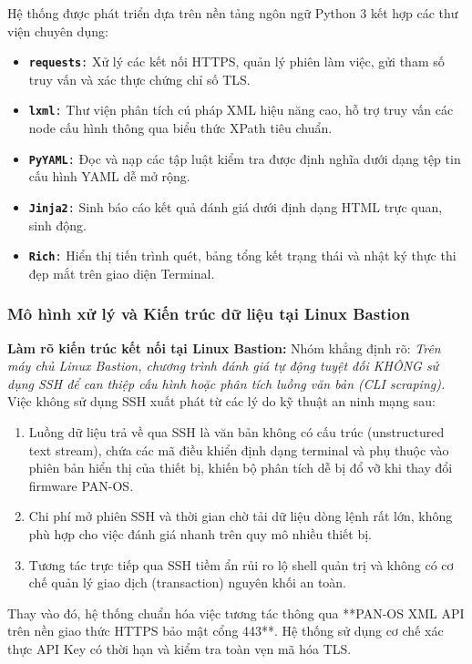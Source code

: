 \documentclass[12pt,a4paper]{article}
\begin{document}
Hệ thống được phát triển dựa trên nền tảng ngôn ngữ Python 3 kết hợp các thư viện chuyên dụng:
\begin{itemize}
    \item \texttt{\textbf{requests}:} Xử lý các kết nối HTTPS, quản lý phiên làm việc, gửi tham số truy vấn và xác thực chứng chỉ số TLS.
    \item \texttt{\textbf{lxml}:} Thư viện phân tích cú pháp XML hiệu năng cao, hỗ trợ truy vấn các node cấu hình thông qua biểu thức XPath tiêu chuẩn.
    \item \texttt{\textbf{PyYAML}:} Đọc và nạp các tập luật kiểm tra được định nghĩa dưới dạng tệp tin cấu hình YAML dễ mở rộng.
    \item \texttt{\textbf{Jinja2}:} Sinh báo cáo kết quả đánh giá dưới định dạng HTML trực quan, sinh động.
    \item \texttt{\textbf{Rich}:} Hiển thị tiến trình quét, bảng tổng kết trạng thái và nhật ký thực thi đẹp mắt trên giao diện Terminal.
\end{itemize}

\subsubsection{Mô hình xử lý và Kiến trúc dữ liệu tại Linux Bastion}
\noindent\textbf{Làm rõ kiến trúc kết nối tại Linux Bastion:}
Nhóm khẳng định rõ: \emph{Trên máy chủ Linux Bastion, chương trình đánh giá tự động tuyệt đối KHÔNG sử dụng SSH để can thiệp cấu hình hoặc phân tích luồng văn bản (CLI scraping).} Việc không sử dụng SSH xuất phát từ các lý do kỹ thuật an ninh mạng sau:
\begin{enumerate}
    \item Luồng dữ liệu trả về qua SSH là văn bản không có cấu trúc (unstructured text stream), chứa các mã điều khiển định dạng terminal và phụ thuộc vào phiên bản hiển thị của thiết bị, khiến bộ phân tích dễ bị đổ vỡ khi thay đổi firmware PAN-OS.
    \item Chi phí mở phiên SSH và thời gian chờ tải dữ liệu dòng lệnh rất lớn, không phù hợp cho việc đánh giá nhanh trên quy mô nhiều thiết bị.
    \item Tương tác trực tiếp qua SSH tiềm ẩn rủi ro lộ shell quản trị và không có cơ chế quản lý giao dịch (transaction) nguyên khối an toàn.
\end{enumerate}

Thay vào đó, hệ thống chuẩn hóa việc tương tác thông qua **PAN-OS XML API trên nền giao thức HTTPS bảo mật cổng 443**. Hệ thống sử dụng cơ chế xác thực API Key có thời hạn và kiểm tra toàn vẹn mã hóa TLS.
\end{document}
